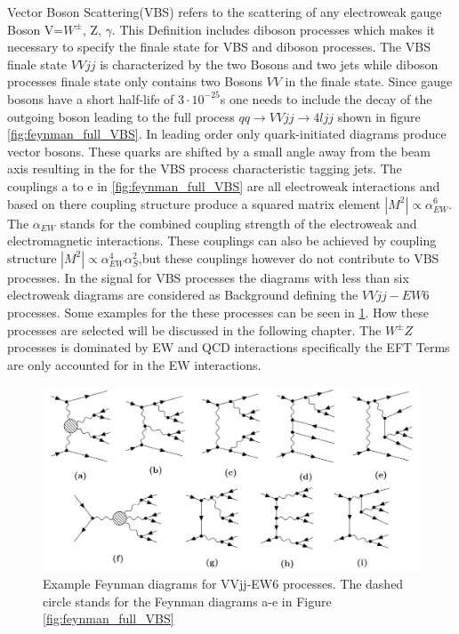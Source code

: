 \documentclass[../Bachelorarbeit.tex]{subfiles}
\begin{document}
Vector Boson Scattering(VBS) refers to the scattering of any electroweak gauge Boson V=$W^{\pm}$, Z, $\gamma$. This 
Definition includes diboson processes which makes it necessary to specify the finale state for VBS and diboson processes.
The VBS finale state $VVjj$ is characterized by the two Bosons and two jets while diboson processes finale state only contains
two Bosons $VV$ in the finale state. Since gauge bosons have a short half-life of $3 \cdot 10^{-25}$s one needs to include the
decay of the outgoing boson leading to the full process $qq\rightarrow VVjj\rightarrow 4ljj$ shown in figure \ref{fig:feynman_full_VBS}.
In leading order only quark-initiated diagrams produce vector bosons. These quarks are shifted by a small angle away from
the beam axis resulting in the for the VBS process characteristic tagging jets. The couplings a to e in \ref{fig:feynman_full_VBS}
are all electroweak interactions and based on there coupling structure produce a squared matrix element
$\left\lvert M^{2} \right\rvert \propto \alpha_{EW}^{6}$. The $\alpha_{EW}$ stands for the combined coupling strength of
the electroweak and electromagnetic interactions. These couplings can also be achieved by coupling structure
$\left\lvert M^{2} \right\rvert \propto \alpha_{EW}^{4}\alpha_{S}^{2}$,but these couplings however do not contribute to VBS processes.
In the signal for VBS processes the diagrams with less than six electroweak diagrams are considered as Background defining the $VVjj-EW6$ processes.
Some examples for the these processes can be seen in \ref{fig:EW6}. How these processes are selected will be discussed in the following chapter.
The $W^{\pm}Z$ processes is dominated by EW and QCD interactions specifically the EFT Terms are only accounted for in the EW interactions.
\begin{figure}[h]
    \centering
    \includegraphics[width=\textwidth]{images/EW6.png}
    \caption{Example Feynman diagrams for VVjj-EW6 processes. The dashed circle stands for the Feynman diagrams a-e in Figure \ref*{fig:feynman_full_VBS}}
    \label{fig:EW6}
\end{figure}
\end{document}
